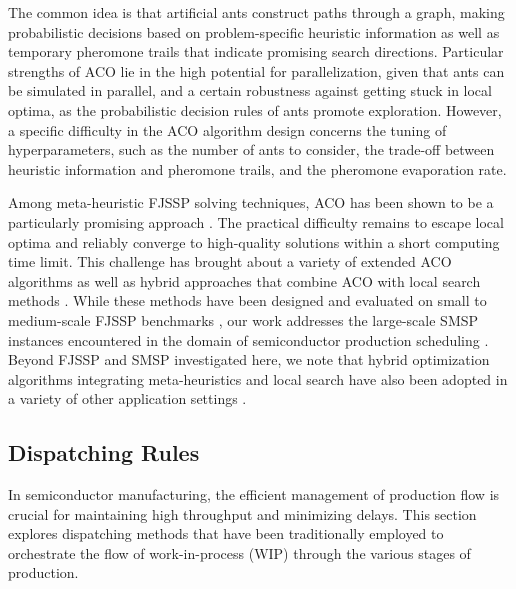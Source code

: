 
The common idea is that artificial ants construct paths through a graph,
making probabilistic decisions based on problem-specific heuristic information as well as temporary pheromone trails that indicate
promising search directions.
Particular strengths of ACO lie in the high potential for parallelization,
given that ants can be simulated in parallel,
and a certain robustness against getting stuck in local optima,
as the probabilistic decision rules of ants promote exploration.
However, a specific difficulty in the ACO algorithm design concerns the
tuning of hyperparameters, such as the number of ants to consider,
the trade-off between heuristic information and pheromone trails, and
the pheromone evaporation rate. 

Among meta-heuristic FJSSP solving techniques,
ACO has been shown to be a particularly promising approach \cite{turkyilmaz2020research}.
The practical difficulty remains to escape local optima and reliably
converge to high-quality solutions within a short computing time limit.
This challenge has brought about a variety of extended ACO algorithms as well as
hybrid approaches that combine ACO with local search methods
\cite{leung2010integrated,li2010improved,xing2010knowledge,thammano2013hybrid,arnaout2014two,el2017dual}.
While these methods have been designed and evaluated
on small to medium-scale FJSSP benchmarks \cite{arnaout2014two},
our work addresses the large-scale SMSP instances encountered in
the domain of semiconductor production scheduling \cite{kopp2020smt2020}.
Beyond FJSSP and SMSP investigated here,
we note that hybrid optimization algorithms integrating meta-heuristics and
local search have also been adopted in a variety of other application settings
\cite{abdel2021hybrid,fontes2023hybrid,li2021hybrid,mohd2023improved,suid2023novel}.
\subsection{Dispatching Rules}

In semiconductor manufacturing, the efficient management of production flow is crucial for maintaining high throughput and minimizing delays. This section explores dispatching methods that have been traditionally employed to orchestrate the flow of work-in-process (WIP) through the various stages of production. 

